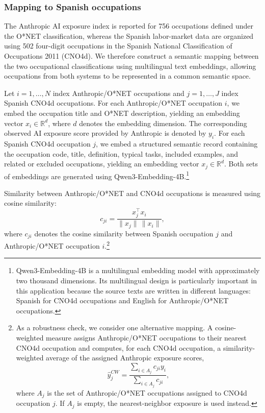 \documentclass[11pt]{article}
\begin{document}
\subsubsection{Mapping to Spanish occupations}
\label{sec:mapping}

The Anthropic AI exposure index is reported for 756 occupations defined under the O*NET classification, whereas the Spanish labor-market data are organized using 502 four-digit occupations in the Spanish National Classification of Occupations 2011 (CNO4d). We therefore construct a semantic mapping between the two occupational classifications using multilingual text embeddings, allowing occupations from both systems to be represented in a common semantic space.

Let $i=1,\ldots,N$ index Anthropic/O*NET occupations and $j=1,\ldots,J$ index Spanish CNO4d occupations. For each Anthropic/O*NET occupation $i$, we embed the occupation title and O*NET description, yielding an embedding vector $x_i\in\mathbb{R}^d$, where $d$ denotes the embedding dimension. The corresponding observed AI exposure score provided by Anthropic is denoted by $y_i$. For each Spanish CNO4d occupation $j$, we embed a structured semantic record containing the occupation code, title, definition, typical tasks, included examples, and related or excluded occupations, yielding an embedding vector $x_j\in\mathbb{R}^d$. Both sets of embeddings are generated using Qwen3-Embedding-4B.\footnote{Qwen3-Embedding-4B is a multilingual embedding model with approximately two thousand dimensions. Its multilingual design is particularly important in this application because the source texts are written in different languages: Spanish for CNO4d occupations and English for Anthropic/O*NET occupations.}

Similarity between Anthropic/O*NET and CNO4d occupations is measured using cosine similarity:
\[
c_{ji}=\frac{x_j^\top x_i}{\lVert x_j\rVert\,\lVert x_i\rVert},
\]
where $c_{ji}$ denotes the cosine similarity between Spanish occupation $j$ and Anthropic/O*NET occupation $i$.\footnote{As a robustness check, we consider one alternative mapping. A cosine-weighted measure assigns Anthropic/O*NET occupations to their nearest CNO4d occupation and computes, for each CNO4d occupation, a similarity-weighted average of the assigned Anthropic exposure scores,
\[
\widehat{y}^{CW}_j=
\frac{\sum_{i\in A_j}c_{ji}y_i}
{\sum_{i\in A_j}c_{ji}},
\]
where $A_j$ is the set of Anthropic/O*NET occupations assigned to CNO4d occupation $j$. If $A_j$ is empty, the nearest-neighbor exposure is used instead.}
\end{document}
